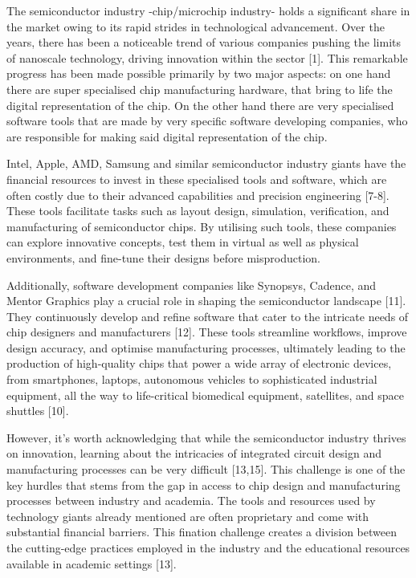The semiconductor industry -chip/microchip industry- holds a significant share in the market owing to its rapid strides in technological advancement. Over the years, there has been a noticeable trend of various companies pushing the limits of nanoscale technology, driving innovation within the sector [1]. This remarkable progress has been made possible primarily by two major aspects: on one hand there are  super specialised chip manufacturing hardware, that bring to life the digital representation of the chip. On the other hand there are very specialised software tools that are made by very specific software developing companies, who are responsible for making said digital representation of the chip. 

Intel, Apple, AMD, Samsung and similar semiconductor industry giants have the financial resources to invest in these specialised tools and software, which are often costly due to their advanced capabilities and precision engineering [7-8]. These tools facilitate tasks such as layout design, simulation, verification, and manufacturing of semiconductor chips. By utilising such tools, these companies can explore innovative concepts, test them in virtual as well as physical environments, and fine-tune their designs before misproduction.

Additionally, software development companies like Synopsys, Cadence, and Mentor Graphics play a crucial role in shaping the semiconductor landscape [11]. They continuously develop and refine software that cater to the intricate needs of chip designers and manufacturers [12]. These tools streamline workflows, improve design accuracy, and optimise manufacturing processes, ultimately leading to the production of high-quality chips that power a wide array of electronic devices, from smartphones, laptops, autonomous vehicles to sophisticated industrial equipment, all the way to life-critical biomedical equipment, satellites, and space shuttles [10]. 

However, it's worth acknowledging that while the semiconductor industry thrives on innovation, learning about the intricacies of integrated circuit design and manufacturing processes can be very difficult [13,15]. This challenge is one of the key hurdles that stems from the gap in access to chip design and manufacturing processes between industry and academia. The tools and resources used by technology giants already mentioned are often proprietary and come with substantial financial barriers. This fination challenge creates a division between the cutting-edge practices employed in the industry and the educational resources available in academic settings [13].

